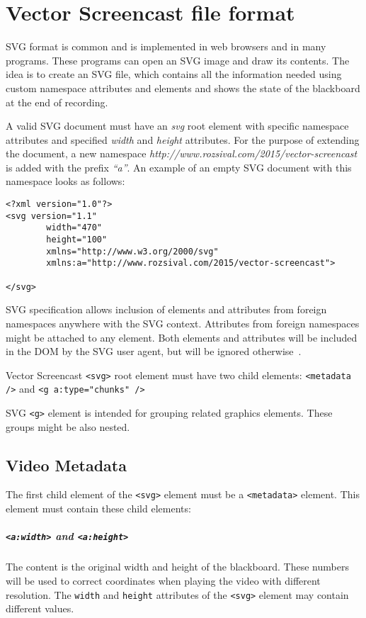 \chapter{Vector Screencast file format}
\label{c:the-format}

SVG format is common and is implemented in web browsers and in many programs. These programs can open an SVG image and draw its contents. The idea is to create an SVG file, which contains all the information needed using custom namespace attributes and elements and shows the state of the blackboard at the end of recording.

A valid SVG document must have an \textit{svg} root element with specific namespace attributes and specified \textit{width} and \textit{height} attributes. For the purpose of extending the document, a new namespace \textit{http://www.rozsival.com/2015/vector-screencast} is added with the prefix \textit{``a''}. An example of an empty SVG document with this namespace looks as follows:

\begin{lstlisting}
<?xml version="1.0"?>
<svg version="1.1"
        width="470"
        height="100"
        xmlns="http://www.w3.org/2000/svg"
        xmlns:a="http://www.rozsival.com/2015/vector-screencast">

</svg>
\end{lstlisting}

SVG specification allows inclusion of elements and attributes from foreign namespaces anywhere with the SVG context. Attributes from foreign namespaces might be attached to any element. Both elements and attributes will be included in the DOM by the SVG user agent, but will be ignored otherwise~\cite{svg_exteding}.

Vector Screencast \verb|<svg>| root element must have two child elements: \verb|<metadata />| and \verb|<g a:type="chunks" />|

SVG \verb|<g>| element is intended for grouping related graphics elements. These groups might be also nested.

\section{Video Metadata}
The first child element of the \verb|<svg>| element must be a \verb|<metadata>| element. This element must contain these child elements:

\paragraph{\texttt{\textless a:width\textgreater} and \texttt{\textless a:height\textgreater}}
The content is the original width and height of the blackboard. These numbers will be used to correct coordinates when playing the video with different resolution. The \verb|width| and \verb|height| attributes of the \verb|<svg>| element may contain different values.

